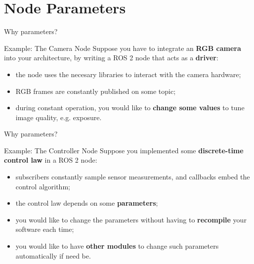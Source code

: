 
\section{Node Parameters}

\begin{frame}{Why parameters?}
\begin{exampleblock}{Example: The Camera Node}
  Suppose you have to integrate an \textbf{RGB camera} into your architecture, by writing a ROS 2 node that acts as a \textbf{driver}:
  \begin{itemize}
    \item the node uses the necesary libraries to interact with the camera hardware;
    \item RGB frames are constantly published on some topic;
    \item during constant operation, you would like to \textbf{change some values} to tune image quality, e.g. exposure.
  \end{itemize}
\end{exampleblock}
\end{frame}
\begin{frame}{Why parameters?}
\begin{exampleblock}{Example: The Controller Node}
  Suppose you implemented some \textbf{discrete-time control law} in a ROS 2 node:
  \begin{itemize}
    \item subscribers constantly sample sensor measurements, and callbacks embed the control algorithm;
    \item the control law depends on some \textbf{parameters};
    \item you would like to change the parameters without having to \textbf{recompile} your software each time;
    \item you would like to have \textbf{other modules} to change such parameters automatically if need be.
  \end{itemize}
\end{exampleblock}
\end{frame}

